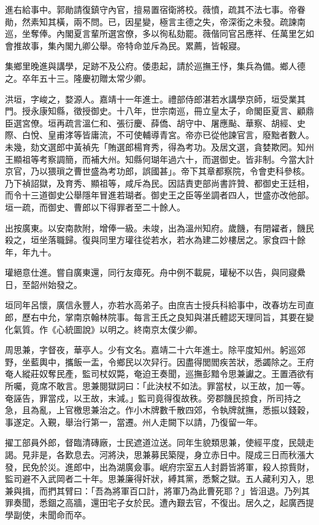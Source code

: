 \begin{pinyinscope}
進右給事中。郭勛請復鎮守內官，擅易置宿衛將校。薇憤，疏其不法七事。帝眷勛，然素知其橫，兩不問。已，因星變，極言主德之失，帝深銜之未發。疏諫南巡，坐奪俸。內閣夏言輩所選宮僚，多以徇私劾罷。薇偕同官呂應祥、任萬里乞如會推故事，集內閣九卿公舉。帝特命並斥為民。累薦，皆報寢。

集鄉里晚進與講學，足跡不及公府。倭患起，請於巡撫王忬，集兵為備。鄉人德之。卒年五十三。隆慶初贈太常少卿。

洪垣，字峻之，婺源人。嘉靖十一年進士。禮部侍郎湛若水講學京師，垣受業其門。授永康知縣，徵授御史。十八年，世宗南巡，冊立皇太子，命閣臣夏言、顧鼎臣選宮僚。垣再疏言溫仁和、張衍慶、薛僑、胡守中、屠應颭、華察、胡經、史際、白悅、皇甫涍等皆庸流，不可使輔導青宮。帝亦已從他諫官言，廢黜者數人。未幾，劾文選郎中黃禎先「賄選郎楊育秀，得為考功。及居文選，貪婪欺罔。知州王顯祖等考察調簡，而補大州。知縣何瑚年過六十，而選御史。皆非制。今當大計京官，乃以猥瑣之曹世盛為考功郎，誤國甚」。帝下其章都察院，令會吏科參核。乃下禎詔獄，及育秀、顯祖等，咸斥為民。因詰責吏部尚書許贊、都御史王廷相，而令十三道御史公舉隱年冒進若瑚者。御史王之臣等坐調者四人，世盛亦改他部。垣一疏，而御史、曹郎以下得罪者至二十餘人。

出按廣東。以安南款附，增俸一級。未竣，出為溫州知府。歲饑，有閉糴者，饑民殺之，垣坐落職歸。復與同里方瓘往從若水，若水為建二妙樓居之。家食四十餘年，年九十。

瓘絕意仕進。嘗自廣東還，同行友瘴死。舟中例不載屍，瓘秘不以告，與同寢纍日，至韶州始發之。

垣同年呂懷，廣信永豐人，亦若水高弟子。由庶吉士授兵科給事中，改春坊左司直郎，歷右中允，掌南京翰林院事。每言王氏之良知與湛氏體認天理同旨，其要在變化氣質。作《心統圖說》以明之。終南京太僕少卿。

周思兼，字督夜，華亭人。少有文名。嘉靖二十六年進士。除平度知州。躬巡郊野，坐藍輿中，攜飯一盂，令鄉民以次舁行。因盡得閭閻疾苦狀，悉蠲除之。王府奄人縱莊奴奪民產，監司杖奴斃，奄迫王奏聞，巡撫彭黯令思兼讞之。王置酒欲有所囑，竟席不敢言。思兼閱獄詞曰：「此決杖不如法。罪當杖，以王故，加一等。奄誣告，罪當戍，以王故，末減。」監司竟得復故秩。旁郡饑民掠食，所司持之急，且為亂，上官檄思兼治之。作小木牌數千散四郊，令執牌就撫，悉振以錢穀，事遂定。入覲，舉治行第一，當遷。州人走闕下以請，乃復留一年。

擢工部員外郎，督臨清磚廠，士民遮道泣送。同年生貌類思兼，使經平度，民競走謁。見非是，各歎息去。河將決，思兼募民築隄，身立赤日中。隄成三日而秋漲大發，民免於災。進郎中，出為湖廣僉事。岷府宗室五人封爵皆將軍，殺人掠貲財，監司避不入武岡者二十年。思兼廉得奸狀，縛其黨，悉繫之獄。五人藏利刃入，思兼與揖，而捫其臂曰：「吾為將軍百口計，將軍乃為此曹死耶？」皆沮退。乃列其罪奏聞，悉錮之高牆，還田宅子女於民。遭內艱去官，不復出。居久之，起廣西提學副使，未聞命而卒。


\end{pinyinscope}
